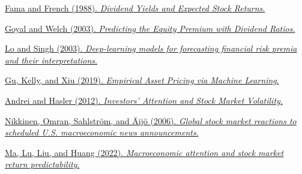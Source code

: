\documentclass{article}
\begin{document}
\begin{thebibliography}{9}
\href{https://www.sciencedirect.com/science/article/pii/0304405X88900207}{Fama and French (1988). \emph{Dividend Yields and Expected Stock Returns}.}

\href{https://www.jstor.org/stable/4133989}{Goyal and Welch (2003). \emph{Predicting the Equity Premium with Dividend Ratios}.}

\href{https://www.tandfonline.com/doi/full/10.1080/14697688.2023.2203844}{Lo and Singh (2003). \emph{Deep-learning models for forecasting financial risk premia and their interpretations}.}

\href{https://dachxiu.chicagobooth.edu/download/ML.pdf}{Gu, Kelly, and Xiu (2019). \emph{Empirical Asset Pricing via Machine Learning}.}

\href{https://www.epfl.ch/labs/cfi/wp-content/uploads/2018/08/WP757_A2.pdf}{Andrei and Hasler (2012). \emph{Investors’ Attention and Stock Market Volatility}.}

\href{https://www.sciencedirect.com/science/article/pii/S104402830600024X}{Nikkinen, Omran, Sahlström, and Äijö (2006). \emph{Global stock market reactions to scheduled U.S. macroeconomic news announcements}.}

\href{https://doi.org/10.1016/j.intfin.2022.101603}{Ma, Lu, Liu, and Huang (2022). \emph{Macroeconomic attention and stock market return predictability}.}

\end{thebibliography}
\end{document}
